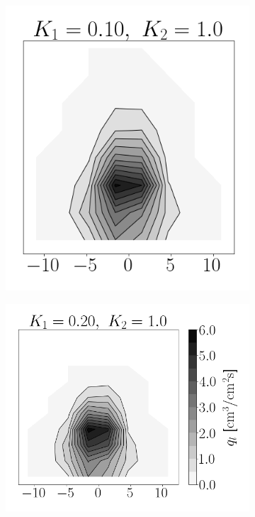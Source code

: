 \begin{figure}[t!]
\begin{subfigure}[b]{0.2\textwidth}
\end{subfigure}
\hspace*{0.02in}
\begin{subfigure}[b]{0.2\textwidth}
	\flushleft
   \includegraphics[scale=0.4]{./part2_developments/figures_ch6_lagrangian_JICF/apte_model_calibration_u_vw_lognorm/maps/k1_0p10_k2_1p0_flux}
\end{subfigure}
\hspace*{0.02in}
\begin{subfigure}[b]{0.2\textwidth}
	\flushleft
   \includegraphics[scale=0.4]{./part2_developments/figures_ch6_lagrangian_JICF/apte_model_calibration_u_vw_lognorm/maps/k1_0p20_k2_1p0_flux}
\end{subfigure}


\end{figure}
